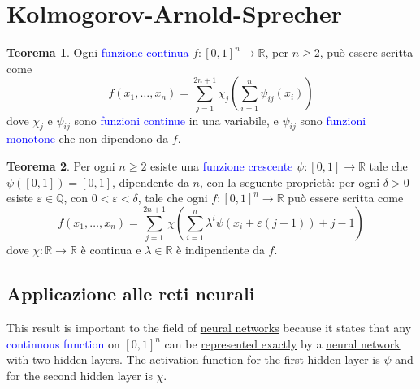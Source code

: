 \documentclass[10pt]{book}
\newcommand{\1}{\mathds{1}}
\newcommand{\R}{\mathds{R}}
\newcommand{\Q}{\mathds{Q}}
\theoremstyle{definition}%
\newtheorem{thm}{Teorema}[section]
\theoremstyle{plain}
\theoremstyle{remark}
\renewcommand{\href}[2]{\textcolor{blue}{#2}}
\begin{document}
\section{Kolmogorov-Arnold-Sprecher}
\label{sec:org9a7262b}

\begin{thm}
Ogni \href{../../../../../org/roam/20250103103252-funzione_continua.org}{funzione continua} \(f:[0,1]^{n}\to \R\), per \(n\ge 2\), può essere scritta come
\begin{equation*}
f(x_{1},\dots,x_{n}) = \sum_{j=1}^{2n+1}\chi_{j}\left(\sum_{i=1}^{n}\psi_{ij}(x_{i})\right)
\end{equation*}
dove \(\chi_{j}\) e \(\psi_{ij}\) sono \href{../../../../../org/roam/20250103103252-funzione_continua.org}{funzioni continue} in una variabile, e \(\psi_{ij}\) sono \href{../../../../../org/roam/20250203132953-funzione_monotona.org}{funzioni monotone} che non dipendono da \(f\).
\label{thm10.3.1}
\end{thm}

\begin{thm}
Per ogni \(n\ge {2}\) esiste una \href{../../../../../org/roam/20250203132953-funzione_monotona.org}{funzione crescente} \(\psi:[0,1]\to \R\) tale che \(\psi\left([0,1]\right)=[0,1]\), dipendente da \(n\), con la seguente proprietà: per ogni \(\delta>0\) esiste \(\varepsilon \in \Q\), con \(0<\varepsilon<\delta\), tale che ogni \(f:[0,1]^{n}\to \R\) può essere scritta come
\begin{equation*}
f(x_{1},\dots,x_{n}) = \sum_{j=1}^{2n+1} \chi\left(
\sum_{i=1}^{n}\lambda^{i}\psi(x_{i}+\varepsilon(j-1)) +j-1
\right)
\end{equation*}
dove \(\chi:\R\to \R\) è continua e \(\lambda \in \R\) è indipendente da \(f\).
\label{thm10.3.2}
\end{thm}
\subsection{Applicazione alle reti neurali}
\label{sec:org98453ef}

This result is important to the field of \hyperref[sec:orgbb3f8c2]{neural networks} because it states that any \href{../../../../../org/roam/20250103103252-funzione_continua.org}{continuous function} on \([0,1]^{n}\) can be \hyperref[sec:org0a7b3a7]{represented exactly} by a \hyperref[sec:orgbb3f8c2]{neural network} with two \hyperref[sec:orgeecc0b4]{hidden layers}. The \hyperref[sec:org594e902]{activation function} for the first hidden layer is \(\psi\) and for the second hidden layer is \(\chi\).
\end{document}
